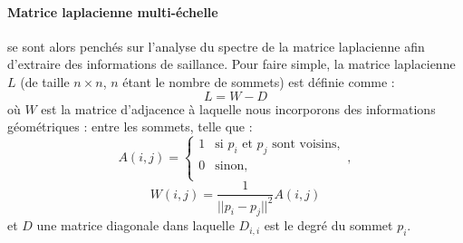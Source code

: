 \paragraph{Matrice laplacienne multi-échelle}
%
 se sont alors penchés sur l'analyse du spectre de la
matrice laplacienne afin d'extraire des informations de saillance. Pour faire
simple, la matrice laplacienne $L$ (de taille $n \times n$, $n$ étant le nombre
de sommets) est définie comme :
%
\begin{equation}
  L = W - D
\end{equation}
%
où $W$ est la matrice d’adjacence à laquelle nous incorporons des informations
géométriques : entre les sommets, telle que :
%
\begin{equation}
  A(i,j) =
  \begin{cases}
    1   & \text{si } p_i \text{ et } p_j \text{ sont voisins},\\
    0   & \text{sinon},\\
  \end{cases},
\end{equation}
%
\begin{equation}
  W(i,j) = \frac{1}{{||p_i - p_j||}^2}A(i,j)
\end{equation}
%
et $D$ une matrice diagonale dans laquelle $D_{i,i}$ est le degré du sommet
$p_i$.


